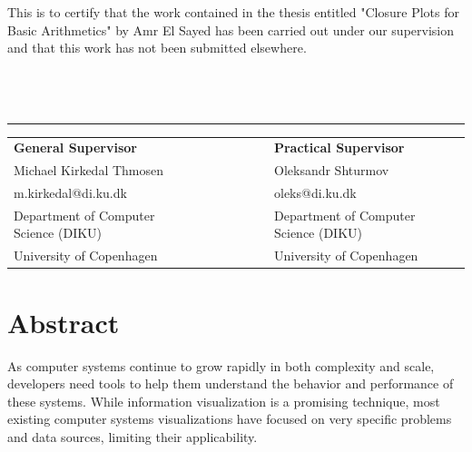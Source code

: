 \documentclass[11pt]{article}
\begin{document}
This is to certify that the work contained in the thesis entitled "Closure Plots for Basic Arithmetics" by Amr El Sayed has been carried out under our supervision and that this work has not been submitted elsewhere.\\\\\\\\
\begin{center}\noindent\rule{8cm}{0.4pt}%

\begin{tabular}{ l l l c r l l l}\\
    \textbf{General Supervisor} & & & & & & \textbf{Practical Supervisor} \\
    Michael Kirkedal Thmosen & & & & & & Oleksandr Shturmov\\
    m.kirkedal@di.ku.dk & & & & & & oleks@di.ku.dk\\
    Department of Computer Science (DIKU) & & & & & & Department of Computer Science (DIKU)\\
    University of Copenhagen & & & & & & University of Copenhagen\\
\end{tabular}
\end{center}
\newpage
\section{Abstract}
As computer systems continue to grow rapidly in both complexity and scale, developers need tools to help them understand the behavior and performance of these systems.  While information visualization is a promising technique, most existing computer systems visualizations have focused on very specific problems and data sources, limiting their applicability.

\end{document}
